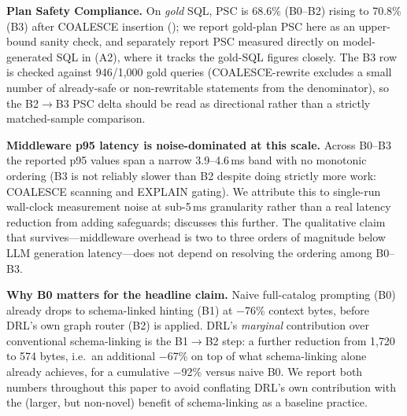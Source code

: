 \documentclass[twocolumn]{svjour3}
\begin{document}
\textbf{Plan Safety Compliance.} On \emph{gold} SQL, PSC is 68.6\% (B0--B2) rising to 70.8\% (B3) after COALESCE insertion (); we report gold-plan PSC here as an upper-bound sanity check, and separately report PSC measured directly on model-generated SQL in  (A2), where it tracks the gold-SQL figures closely.
The B3 row is checked against 946/1{,}000 gold queries (COALESCE-rewrite excludes a small number of already-safe or non-rewritable statements from the denominator), so the B2$\to$B3 PSC delta should be read as directional rather than a strictly matched-sample comparison.

\textbf{Middleware p95 latency is noise-dominated at this scale.} Across B0--B3 the reported p95 values span a narrow 3.9--4.6\,ms band with no monotonic ordering (B3 is not reliably slower than B2 despite doing strictly more work: COALESCE scanning and EXPLAIN gating). We attribute this to single-run wall-clock measurement noise at sub-5\,ms granularity rather than a real latency reduction from adding safeguards;  discusses this further. The qualitative claim that survives---middleware overhead is two to three orders of magnitude below LLM generation latency---does not depend on resolving the ordering among B0--B3.

\textbf{Why B0 matters for the headline claim.} Naive full-catalog prompting (B0) already drops to schema-linked hinting (B1) at $-$76\% context bytes, before DRL's own graph router (B2) is applied. DRL's \emph{marginal} contribution over conventional schema-linking is the B1$\to$B2 step: a further reduction from 1{,}720 to 574 bytes, i.e.\ an additional $-$67\% on top of what schema-linking alone already achieves, for a cumulative $-$92\% versus naive B0. We report both numbers throughout this paper to avoid conflating DRL's own contribution with the (larger, but non-novel) benefit of schema-linking as a baseline practice.
\end{document}
